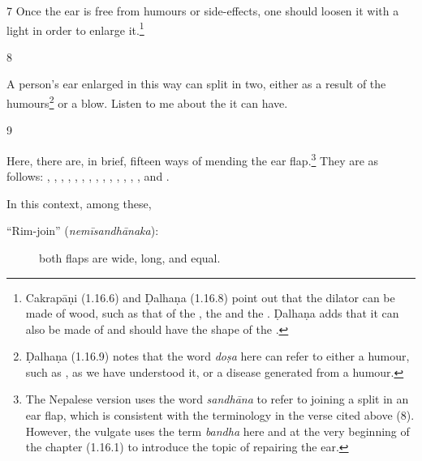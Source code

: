 \begin{translation}
    \item[7]
    Once the ear is free from humours or side-effects, one should 
    loosen it with a light  in order to enlarge it.\footnote{Cakrapāṇi (1.16.6) and Ḍalhaṇa (1.16.8) point out that the dilator can be made of wood, such as that of the , the  and the . Ḍalhaṇa adds that it can also be made of  and should have the shape of the .}
    
    \item[8]
    
    \begin{sloka}

A person's ear enlarged in this way can split in two, either as a result of the humours\footnote{Ḍalhaṇa (1.16.9) notes that the word \emph{doṣa} here can refer to either a humour, such as , as we have understood it, or a disease generated from a humour.} or a blow. Listen to me about the  it can have.
        
    \end{sloka}
    
        \item[9]
    
Here, there are, in brief, fifteen ways of mending the ear flap.\footnote{The Nepalese version uses the word \emph{sandhāna} to refer to joining a split in an ear flap, which is consistent with the terminology in the verse cited above (8). However, the vulgate uses the term \emph{bandha} here and at the very beginning of the chapter (1.16.1) to introduce the topic of repairing the ear.}  They are as follows:
    , , , , , , , , , , 
    , ,
    , , and .
    
    In this context, among these, 
    \begin{description}
        
        \item[\mdseries``Rim-join'' (\emph{nemīsandhānaka}):]
        both flaps are wide, long, and equal.
        

\end{description}
\end{translation}
